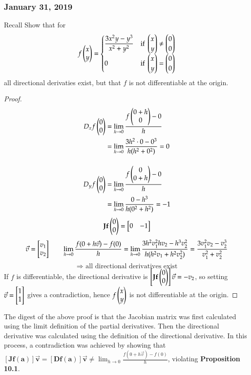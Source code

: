 \subsubsection*{January 31, 2019}

Recall
  Show that for
  \[f\begin{pmatrix} x \\ y \end{pmatrix} = \begin{cases}
  \displaystyle \frac{3x^2y - y^3}{x^2+y^2} & \text{if } \begin{pmatrix} x \\ y \end{pmatrix} \neq \begin{pmatrix} 0 \\ 0 \end{pmatrix} \\
  0 & \text{if } \begin{pmatrix} x \\ y \end{pmatrix} = \begin{pmatrix} 0 \\ 0 \end{pmatrix}
  \end{cases}\]
  all directional derivaties exist, but that $f$ is not differentiable at the origin.
  
\begin{proof}
\begin{align*}
  D_xf\begin{pmatrix} 0 \\ 0 \end{pmatrix} &= \lim_{h\to 0} \frac{f\begin{pmatrix} 0 + h \\ 0 \end{pmatrix}-0}{h} \\
  &= \lim_{h\to 0}\frac{3h^2\cdot 0 - 0^3}{h(h^2+0^2)}=0\\[12pt]
  D_yf\begin{pmatrix} 0 \\ 0 \end{pmatrix} &= \lim_{h\to 0} \frac{f\begin{pmatrix} 0 \\ 0+h \end{pmatrix}-0}{h} \\
&= \lim_{h\to 0} \frac{0-h^3}{h(0^2+h^2)}=-1
\end{align*}
\[\textbf{Jf}\begin{pmatrix} 0 \\ 0 \end{pmatrix} = \begin{bmatrix} 0 & -1 \end{bmatrix}\]
\[\vec{v}=\begin{bmatrix} v_1 \\ v_2 \end{bmatrix}\qquad \lim_{h\to 0}\frac{f(0+h\vec{v})-f(0)}{h}=\lim_{h\to 0}\frac{3h^2v_1^2hv_2-h^3v_2^2}{h(h^2v_1+h^2 v_2^2)}=\frac{3v_1^2v_2-v_2^3}{v_1^2+v_2^2}\]
\[\Rightarrow \text{ all directional derivatives exist}\]
If $f$ is differentiable, the directional derivative is $\left[\textbf{Jf}\begin{pmatrix} 0 \\ 0 \end{pmatrix}\right]\vec{v}=-v_2$, so setting $\vec{v}=\begin{bmatrix} 1 \\ 1 \end{bmatrix}$ gives a contradiction, hence $f\begin{pmatrix} x \\ y \end{pmatrix}$ is not differentiable at the origin.
\end{proof}

The digest of the above proof is that the Jacobian matrix was first calculated using the limit definition of the partial derivatives. Then the directional derivative was calculated using the definition of the directional derivative. In this process, a contradiction was achieved by showing that $[\bm{Jf}(\bm{a})]\vec{\bm{v}}=[\bm{Df}(\bm{a})]\vec{\bm{v}}\neq \lim_{h\to 0}\frac{f(0+h\vec{v})-f(0)}{h}$, violating \textbf{Proposition 10.1}. 


